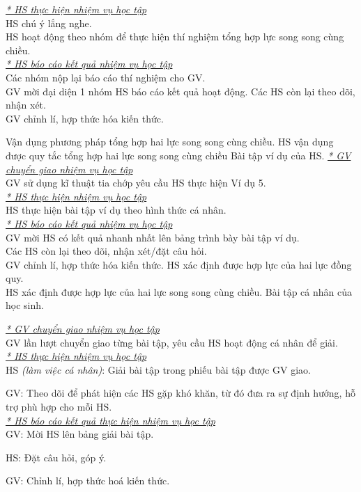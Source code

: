 {\begin{itemize}[label=-]
	\end{itemize}
		\textit{\underline{* HS thực hiện nhiệm vụ học tập}}\\
	HS chú ý lắng nghe.\\
	HS hoạt động theo nhóm để thực hiện thí nghiệm tổng hợp lực song song cùng chiều.\\
		\textit{\underline{* HS báo cáo kết quả nhiệm vụ học tập}}\\
	Các nhóm nộp lại báo cáo thí nghiệm cho GV.\\
	GV mời đại diện 1 nhóm HS báo cáo kết quả hoạt động. Các HS còn lại theo dõi, nhận xét.\\
	GV chỉnh lí, hợp thức hóa kiến thức.
}
\hoatdong
{Vận dụng phương pháp tổng hợp hai lực song song cùng chiều.
}
{HS vận dụng được quy tắc tổng hợp hai lực song song cùng chiều
}
{Bài tập ví dụ của HS.
}
{\textit{\underline{* GV chuyển giao nhiệm vụ học tập}}\\
	GV sử dụng kĩ thuật tia chớp yêu cầu HS thực hiện Ví dụ 5.\\
	\textit{\underline{* HS thực hiện nhiệm vụ học tập}}\\
	HS thực hiện bài tập ví dụ theo hình thức cá nhân.\\
	\textit{\underline{* HS báo cáo kết quả nhiệm vụ học tập}}\\
	GV mời HS có kết quả nhanh nhất lên bảng trình bày bài tập ví dụ.\\
	Các HS còn lại theo dõi, nhận xét/đặt câu hỏi.\\
	GV chỉnh lí, hợp thức hóa kiến thức.
}
{
	HS xác định được hợp lực của hai lực đồng quy.\\
	HS xác định được hợp lực của hai lực song song cùng chiều.
}
{
	Bài tập cá nhân của học sinh.
}
{
	\textit{\underline{* GV chuyển giao nhiệm vụ học tập}}\\
	GV lần lượt chuyển giao từng bài tập, yêu cầu HS hoạt động cá nhân để giải.\\
	\textit{\underline{* HS thực hiện nhiệm vụ học tập}}\\
	HS \textit{(làm việc cá nhân)}:  Giải bài tập trong phiếu bài tập được GV giao. 
	
	GV: Theo dõi để phát hiện các HS gặp khó khăn, từ đó đưa ra sự định hướng, hỗ trợ phù hợp cho mỗi HS.\\
	\textit{\underline{* HS báo cáo kết quả thực hiện nhiệm vụ học tập}}\\
	GV: Mời HS lên bảng giải bài tập.
	
	HS: Đặt câu hỏi, góp ý.
	
	GV: Chỉnh lí, hợp thức hoá kiến thức.
}

